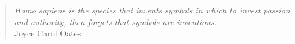 \phantom{ }
\vspace{4in}

\begin{singlespace}
\begin{quote}
  \textit{Homo sapiens is the species that invents symbols in which to invest passion and authority, 
  then forgets that symbols are inventions.} \\
  \phantom{ }\hfill{Joyce Carol Oates}
\end{quote}
\end{singlespace}

%
